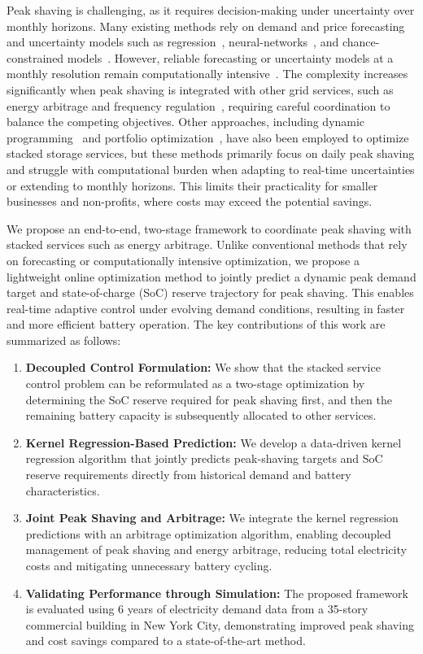 \documentclass[conference]{IEEEtran}
\begin{document}
Peak shaving is challenging, as it requires decision-making under uncertainty over monthly horizons. Many existing methods rely on demand and price forecasting and uncertainty models such as regression~\cite{deSalis2014energy}, neural-networks~\cite{zhang2023novel}, and chance-constrained models~\cite{qi2023chance}. However, reliable forecasting or uncertainty models at a monthly resolution remain computationally intensive~\cite{kaut2024handling, cortes2025economic, mo2021optimal}. The complexity increases significantly when peak shaving is integrated with other grid services, such as energy arbitrage and frequency regulation~\cite{shi2017using}, requiring careful coordination to balance the competing objectives. Other approaches, including dynamic programming~\cite{engels2020optimal} and portfolio optimization~\cite{qi2023portfolio}, have also been employed to optimize stacked storage services, but these methods primarily focus on daily peak shaving and struggle with computational burden when adapting to real-time uncertainties or extending to monthly horizons. This limits their practicality for smaller businesses and non-profits, where costs may exceed the potential savings.

We propose an end-to-end, two-stage framework to coordinate peak shaving with stacked services such as energy arbitrage. Unlike conventional methods that rely on forecasting or computationally intensive optimization, we propose a lightweight online optimization method to jointly predict a dynamic peak demand target and state-of-charge (SoC) reserve trajectory for peak shaving. This enables real-time adaptive control under evolving demand conditions, resulting in faster and more efficient battery operation. The key contributions of this work are summarized as follows:
\begin{enumerate}
    \item \textbf{Decoupled Control Formulation:} We show that the stacked service control problem can be reformulated as a two-stage optimization by determining the SoC reserve required for peak shaving first, and then the remaining battery capacity is subsequently allocated to other services.
    \item \textbf{Kernel Regression-Based Prediction:} We develop a data-driven kernel regression algorithm that jointly predicts peak-shaving targets and SoC reserve requirements directly from historical demand and battery characteristics.
    \item \textbf{Joint Peak Shaving and Arbitrage:} We integrate the kernel regression predictions with an arbitrage optimization algorithm, enabling decoupled management of peak shaving and energy arbitrage, reducing total electricity costs and mitigating unnecessary battery cycling.
    \item \textbf{Validating Performance through Simulation:} The proposed framework is evaluated using 6 years of electricity demand data from a 35-story commercial building in New York City, demonstrating improved peak shaving and cost savings compared to a state-of-the-art method.
\end{enumerate}
\end{document}
